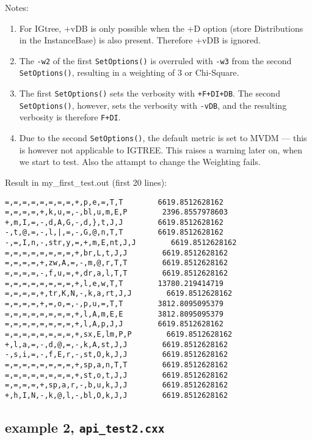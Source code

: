 \documentclass{report}
\begin{document}
Notes:
\begin{enumerate}
\item For IGtree, +vDB is only possible when the +D option (store Distributions
 in the InstanceBase) is also present. Therefore +vDB is ignored.

\item The {\tt -w2} of the first {\tt SetOptions()} is overruled with
  {\tt -w3} from the second {\tt SetOptions()}, resulting in a
  weighting of 3 or Chi-Square. 
\item The first {\tt SetOptions()} sets the verbosity with {\tt +F+DI+DB}.
The second {\tt SetOptions()}, however, sets the verbosity with {\tt -vDB}, and the resulting verbosity is therefore {\tt F+DI}.
\item Due to the second {\tt SetOptions()}, the default metric is set to
MVDM --- this is however not applicable to IGTREE. This raises a warning 
later on, when we start to test. Also the attampt to change the Weighting fails.
\end{enumerate}

Result in my\_first\_test.out (first 20 lines):
\begin{footnotesize}
\begin{verbatim}
=,=,=,=,=,=,=,=,+,p,e,=,T,T        6619.8512628162
=,=,=,=,+,k,u,=,-,bl,u,m,E,P        2396.8557978603
+,m,I,=,-,d,A,G,-,d,},t,J,J        6619.8512628162
-,t,@,=,-,l,|,=,-,G,@,n,T,T        6619.8512628162
-,=,I,n,-,str,y,=,+,m,E,nt,J,J        6619.8512628162
=,=,=,=,=,=,=,=,+,br,L,t,J,J        6619.8512628162
=,=,=,=,+,zw,A,=,-,m,@,r,T,T        6619.8512628162
=,=,=,=,-,f,u,=,+,dr,a,l,T,T        6619.8512628162
=,=,=,=,=,=,=,=,+,l,e,w,T,T        13780.219414719
=,=,=,=,+,tr,K,N,-,k,a,rt,J,J        6619.8512628162
=,=,=,=,+,=,o,=,-,p,u,=,T,T        3812.8095095379
=,=,=,=,=,=,=,=,+,l,A,m,E,E        3812.8095095379
=,=,=,=,=,=,=,=,+,l,A,p,J,J        6619.8512628162
=,=,=,=,=,=,=,=,+,sx,E,lm,P,P        6619.8512628162
+,l,a,=,-,d,@,=,-,k,A,st,J,J        6619.8512628162
-,s,i,=,-,f,E,r,-,st,O,k,J,J        6619.8512628162
=,=,=,=,=,=,=,=,+,sp,a,n,T,T        6619.8512628162
=,=,=,=,=,=,=,=,+,st,o,t,J,J        6619.8512628162
=,=,=,=,+,sp,a,r,-,b,u,k,J,J        6619.8512628162
+,h,I,N,-,k,@,l,-,bl,O,k,J,J        6619.8512628162
\end{verbatim}
\end{footnotesize}
\clearpage

\subsection{example 2, {\tt api\_test2.cxx}}
\end{document}
